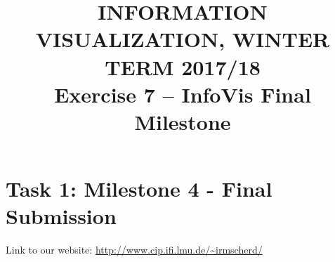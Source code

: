 \documentclass[11pt, twoside, BCOR=8mm, DIV=12]{scrartcl}
\title{{\Large INFORMATION VISUALIZATION, WINTER TERM 2017/18} \\ Exercise 7  – InfoVis Final Milestone}
\begin{document}
\maketitle
\section*{Task 1: Milestone 4 - Final Submission}
Link to our website: \url{http://www.cip.ifi.lmu.de/~irmscherd/}
\end{document}
